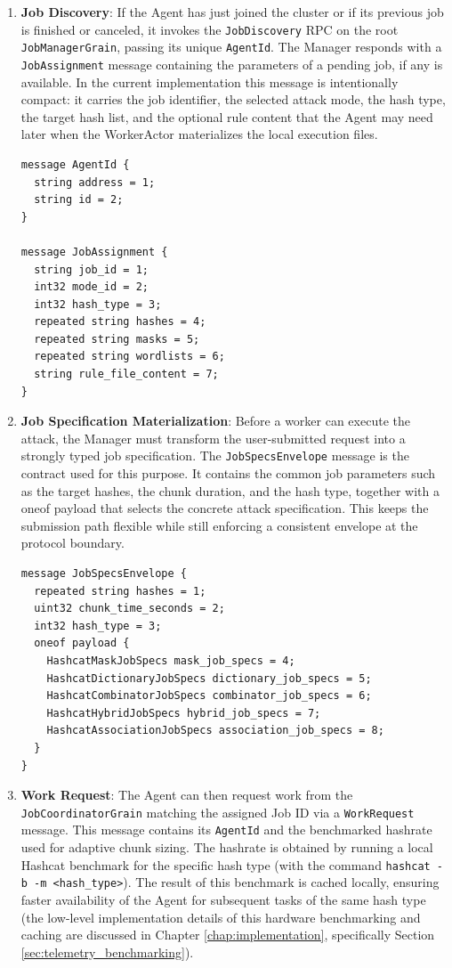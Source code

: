 \begin{enumerate}
    \item \textbf{Job Discovery}: If the Agent has just joined the cluster or if its previous job is finished or canceled, it invokes the \verb|JobDiscovery| RPC on the root \verb|JobManagerGrain|, passing its unique \verb|AgentId|. The Manager responds with a \verb|JobAssignment| message containing the parameters of a pending job, if any is available. In the current implementation this message is intentionally compact: it carries the job identifier, the selected attack mode, the hash type, the target hash list, and the optional rule content that the Agent may need later when the WorkerActor materializes the local execution files.

\begin{verbatim}
message AgentId {
  string address = 1;
  string id = 2;
}

message JobAssignment {
  string job_id = 1;
  int32 mode_id = 2;
  int32 hash_type = 3;
  repeated string hashes = 4;
  repeated string masks = 5;
  repeated string wordlists = 6;
  string rule_file_content = 7;
}
\end{verbatim}

    \item \textbf{Job Specification Materialization}: Before a worker can execute the attack, the Manager must transform the user-submitted request into a strongly typed job specification. The \verb|JobSpecsEnvelope| message is the contract used for this purpose. It contains the common job parameters such as the target hashes, the chunk duration, and the hash type, together with a oneof payload that selects the concrete attack specification. This keeps the submission path flexible while still enforcing a consistent envelope at the protocol boundary.

\begin{verbatim}
message JobSpecsEnvelope {
  repeated string hashes = 1;
  uint32 chunk_time_seconds = 2;
  int32 hash_type = 3;
  oneof payload {
    HashcatMaskJobSpecs mask_job_specs = 4;
    HashcatDictionaryJobSpecs dictionary_job_specs = 5;
    HashcatCombinatorJobSpecs combinator_job_specs = 6;
    HashcatHybridJobSpecs hybrid_job_specs = 7;
    HashcatAssociationJobSpecs association_job_specs = 8;
  }
}
\end{verbatim}

    \item \textbf{Work Request}: The Agent can then request work from the \verb|JobCoordinatorGrain| matching the assigned Job ID via a \verb|WorkRequest| message. This message contains its \verb|AgentId| and the benchmarked hashrate used for adaptive chunk sizing. The hashrate is obtained by running a local Hashcat benchmark for the specific hash type (with the command \verb|hashcat -b -m <hash_type>|). The result of this benchmark is cached locally, ensuring faster availability of the Agent for subsequent tasks of the same hash type (the low-level implementation details of this hardware benchmarking and caching are discussed in Chapter \ref{chap:implementation}, specifically Section \ref{sec:telemetry_benchmarking}).


\end{enumerate}
